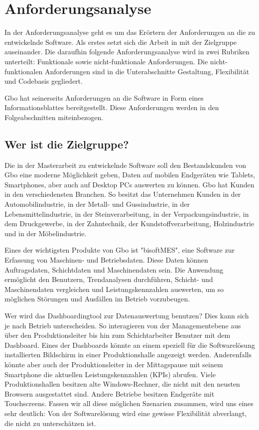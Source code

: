 \chapter{Anforderungsanalyse}
\label{chap:anforderungsanalyse}

In der Anforderungsanalyse geht es um das Erörtern der Anforderungen an die zu entwickelnde Software.
Als erstes setzt sich die Arbeit in  mit der
Zielgruppe auseinander. Die daraufhin folgende Anforderungsanalyse wird in zwei
Rubriken unterteilt: Funktionale sowie nicht-funktionale Anforderungen. Die
nicht-funktionalen Anforderungen sind in die Unterabschnitte Gestaltung, Flexibilität
und Codebasis gegliedert.

Gbo hat seinerseits Anforderungen an die Software in Form eines Informationsblattes
bereitgestellt. Diese Anforderungen werden in den Folgeabschnitten miteinbezogen.

\section{Wer ist die Zielgruppe?}
\label{sec:weristmeinezielgruppe}
Die in der Masterarbeit zu entwickelnde Software
soll den Bestandskunden von Gbo eine moderne Möglichkeit geben, Daten 
auf mobilen Endgeräten wie Tablets, Smartphones, aber auch auf Desktop PCs auswerten zu können.
Gbo hat Kunden in den verschiedensten Branchen. So besitzt das Unternehmen
Kunden in der Automobilindustrie, in der Metall- und Gussindustrie, in der Lebensmittelindustrie,
in der Steinverarbeitung, in der Verpackungsindustrie, in dem Druckgewerbe, in der
Zahntechnik, der Kundstoffverarbeitung, Holzindustrie und in der Möbelindustrie.\cite{GBODatacompBranchenloesungen}

Eines der wichtigsten Produkte von Gbo ist "bisoftMES", eine Software zur Erfassung von
Maschinen- und Betriebsdaten. Diese Daten können Auftragsdaten, Schichtdaten und Maschinendaten sein.
Die Anwendung ermöglicht den Benutzern, Trendanalysen durchführen, Schicht- und Maschinendaten vergleichen und
Leistungskennzahlen auswerten, um so möglichen Störungen und Ausfällen im Betrieb vorzubeugen.

Wer wird das Dashboardingtool zur Datenauswertung benutzen? Dies kann sich je nach Betrieb unterscheiden. So interagieren von der
Managementebene aus über den Produktionsleiter bis hin zum Schichtarbeiter Benutzer mit dem
Dashboard. Eines der Dashboards könnte an einem speziell für die Softwarelösung
installierten Bildschirm in einer Produktionshalle angezeigt werden. Anderenfalls könnte aber
auch der Produktionsleiter in der Mittagspause mit seinem Smartphone die aktuellen Leistungskennzahlen 
(KPIs) abrufen. Viele Produktionshallen besitzen alte Windows-Rechner, die nicht
mit den neusten Browsern ausgestattet sind. Andere Betriebe besitzen Endgeräte mit Touchscreens.
Fassen wir all diese möglichen Szenarien zusammen, wird uns eines sehr deutlich: Von der
Softwarelösung wird eine gewisse Flexibilität abverlangt, die nicht zu unterschätzen ist.

